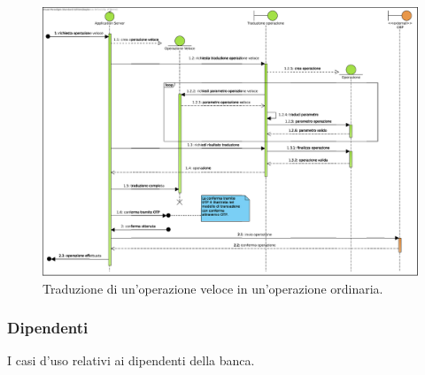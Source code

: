 \begin{figure}[h]
    \centering
    \includegraphics[height=\textwidth, angle=90]{Images/sequence/Operazione_Veloce.eps}
    \caption{Traduzione di un'operazione veloce in un'operazione ordinaria.}
    \label{fig:sequence:operazione-veloce}
\end{figure}

\subsubsection{Dipendenti}

I casi d'uso relativi ai dipendenti della banca.
